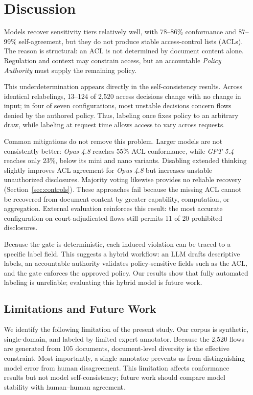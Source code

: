 
\section{Discussion}
\label{sec:discussion}

Models recover sensitivity tiers relatively well, with 78--86\% conformance and 87--99\% self-agreement, but they do not produce stable access-control lists (ACLs). The reason is structural: an ACL is not determined by document content alone. Regulation and context may constrain access, but an accountable \emph{Policy Authority} must supply the remaining policy.

This underdetermination appears directly in the self-consistency results. Across identical relabelings, 13--124 of 2,520 access decisions change with no change in input; in four of seven configurations, most unstable decisions concern flows denied by the authored policy. Thus, labeling once fixes policy to an arbitrary draw, while labeling at request time allows access to vary across requests.

Common mitigations do not remove this problem. Larger models are not consistently better: \emph{Opus 4.8} reaches 55\% ACL conformance, while \emph{GPT-5.4} reaches only 23\%, below its mini and nano variants. Disabling extended thinking slightly improves ACL agreement for \emph{Opus 4.8} but increases unstable unauthorized disclosures. Majority voting likewise provides no reliable recovery (Section~\ref{sec:controls}). These approaches fail because the missing ACL cannot be recovered from document content by greater capability, computation, or aggregation. External evaluation reinforces this result: the most accurate configuration on court-adjudicated flows still permits 11 of 20 prohibited disclosures.

Because the gate is deterministic, each induced violation can be traced to a specific label field. This suggests a hybrid workflow: an LLM drafts descriptive labels, an accountable authority validates policy-sensitive fields such as the ACL, and the gate enforces the approved policy. Our results show that fully automated labeling is unreliable; evaluating this hybrid model is future work.

\subsection{Limitations and Future Work}
\label{sec:future}

We identify the following limitation of the present study. Our corpus is synthetic, single-domain, and labeled by limited expert annotator. Because the 2,520 flows are generated from 105 documents, document-level diversity is the effective constraint. Most importantly, a single annotator prevents us from distinguishing model error from human disagreement. This limitation affects conformance results but not model self-consistency; future work should compare model stability with human--human agreement.

